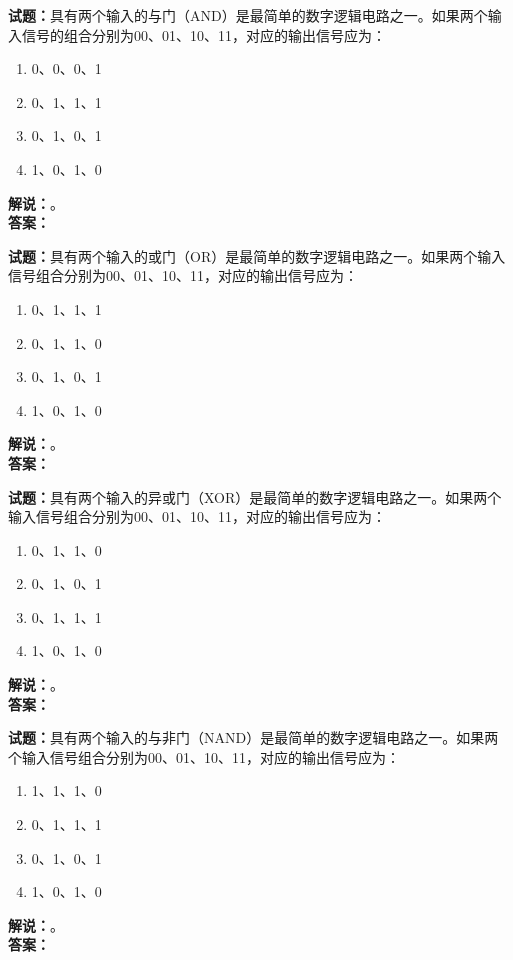 \documentclass{ctexbook}
\begin{document}
\vspace{\baselineskip}

\noindent\textbf{试题：}具有两个输入的与门（AND）是最简单的数字逻辑电路之一。如果两个输入信号的组合分别为00、01、10、11，对应的输出信号应为：
\begin{enumerate}[leftmargin=3em]
  \item 0、0、0、1
  \item 0、1、1、1
  \item 0、1、0、1
  \item 1、0、1、0
\end{enumerate}
\noindent\textbf{解说：}\textbf{}。\\\noindent\textbf{答案：}

\vspace{\baselineskip}

\noindent\textbf{试题：}具有两个输入的或门（OR）是最简单的数字逻辑电路之一。如果两个输入信号组合分别为00、01、10、11，对应的输出信号应为：
\begin{enumerate}[leftmargin=3em]
  \item 0、1、1、1
  \item 0、1、1、0
  \item 0、1、0、1
  \item 1、0、1、0
\end{enumerate}
\noindent\textbf{解说：}\textbf{}。\\\noindent\textbf{答案：}

\vspace{\baselineskip}

\noindent\textbf{试题：}具有两个输入的异或门（XOR）是最简单的数字逻辑电路之一。如果两个输入信号组合分别为00、01、10、11，对应的输出信号应为：
\begin{enumerate}[leftmargin=3em]
  \item 0、1、1、0
  \item 0、1、0、1
  \item 0、1、1、1
  \item 1、0、1、0
\end{enumerate}
\noindent\textbf{解说：}\textbf{}。\\\noindent\textbf{答案：}

\vspace{\baselineskip}

\noindent\textbf{试题：}具有两个输入的与非门（NAND）是最简单的数字逻辑电路之一。如果两个输入信号组合分别为00、01、10、11，对应的输出信号应为：
\begin{enumerate}[leftmargin=3em]
  \item 1、1、1、0
  \item 0、1、1、1
  \item 0、1、0、1
  \item 1、0、1、0
\end{enumerate}
\noindent\textbf{解说：}\textbf{}。\\\noindent\textbf{答案：}
\end{document}
